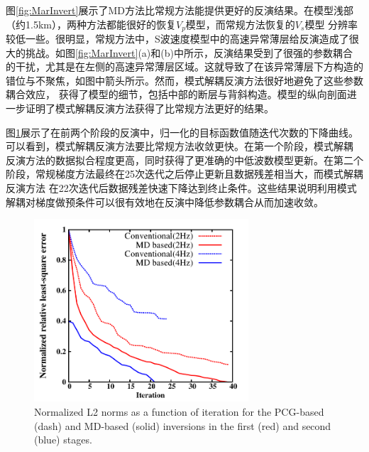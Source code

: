 图\ref{fig:MarInvert}展示了MD方法比常规方法能提供更好的反演结果。在模型浅部（约1.5km），两种方法都能很好的恢复$V_p$模型，而常规方法恢复的$V_s$模型
分辨率较低一些。很明显，常规方法中，S波速度模型中的高速异常薄层给反演造成了很大的挑战。如图\ref{fig:MarInvert}(a)和(b)中所示，反演结果受到了很强的参数耦合
的干扰，尤其是在左侧的高速异常薄层区域。这就导致了在该异常薄层下方构造的错位与不聚焦，如图中箭头所示。然而，模式解耦反演方法很好地避免了这些参数耦合效应，
获得了模型的细节，包括中部的断层与背斜构造。模型的纵向剖面进一步证明了模式解耦反演方法获得了比常规方法更好的结果。

图\ref{fig:L2}展示了在前两个阶段的反演中，归一化的目标函数值随迭代次数的下降曲线。可以看到，模式解耦反演方法要比常规方法收敛更快。在第一个阶段，模式解耦
反演方法的数据拟合程度更高，同时获得了更准确的中低波数模型更新。在第二个阶段，常规梯度方法最终在25次迭代之后停止更新且数据残差相当大，而模式解耦反演方法
在22次迭代后数据残差快速下降达到终止条件。这些结果说明利用模式解耦对梯度做预条件可以很有效地在反演中降低参数耦合从而加速收敛。
\begin{figure}
    \begin{center}
        \includegraphics[width=8cm]{Figure/chapter02/tariqsugresult/Fig/L2.pdf}
        \caption{
            Normalized L2 norms as a function of iteration for the PCG-based (dash)
            and MD-based (solid) inversions in the first (red) and second (blue)
            stages.
    }
    \label{fig:L2}
    \end{center}
\end{figure}
